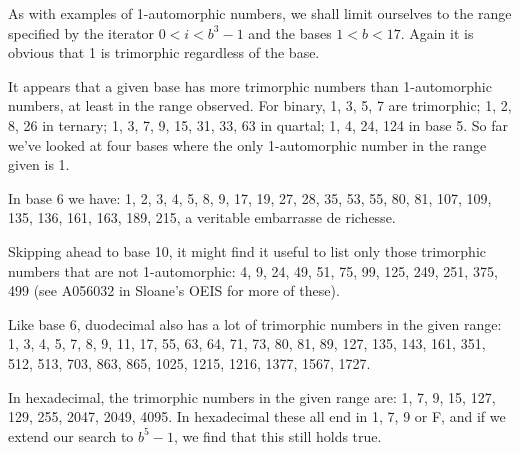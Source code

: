 \documentclass[12pt]{article}
\begin{document}
As with examples of 1-automorphic numbers, we shall limit ourselves to the range specified by the iterator $0 < i < b^3 - 1$ and the bases $1 < b < 17$. Again it is obvious that 1 is trimorphic regardless of the base.

It appears that a given base has more trimorphic numbers than 1-automorphic numbers, at least in the range observed. For binary, 1, 3, 5, 7 are trimorphic; 1, 2, 8, 26 in ternary; 1, 3, 7, 9, 15, 31, 33, 63 in quartal; 1, 4, 24, 124 in base 5. So far we've looked at four bases where the only 1-automorphic number in the range given is 1.

In base 6 we have: 1, 2, 3, 4, 5, 8, 9, 17, 19, 27, 28, 35, 53, 55, 80, 81, 107, 109, 135, 136, 161, 163, 189, 215, a veritable embarrasse de richesse.

Skipping ahead to base 10, it might find it useful to list only those trimorphic numbers that are not 1-automorphic: 4, 9, 24, 49, 51, 75, 99, 125, 249, 251, 375, 499 (see A056032 in Sloane's OEIS for more of these).

Like base 6, duodecimal also has a lot of trimorphic numbers in the given range: 1, 3, 4, 5, 7, 8, 9, 11, 17, 55, 63, 64, 71, 73, 80, 81, 89, 127, 135, 143, 161, 351, 512, 513, 703, 863, 865, 1025, 1215, 1216, 1377, 1567, 1727.

In hexadecimal, the trimorphic numbers in the given range are: 1, 7, 9, 15, 127, 129, 255, 2047, 2049, 4095. In hexadecimal these all end in 1, 7, 9 or F, and if we extend our search to $b^5 - 1$, we find that this still holds true.
\end{document}
